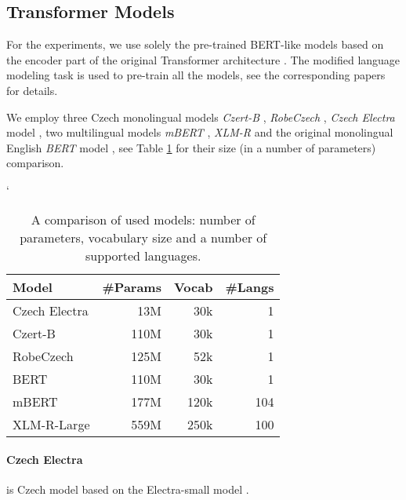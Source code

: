 \documentclass[10pt, a4paper]{article}
\begin{document}
\subsection{Transformer Models}
For the experiments, we use solely the pre-trained BERT-like models based on the encoder part of the original Transformer architecture \cite{attention-all-transformer}. The modified language modeling task is used to pre-train all the models, see the corresponding papers for details.

\par We employ three Czech monolingual models \textit{Czert-B} \cite{czert}, \textit{RobeCzech} \cite{straka2021robeczech}, \textit{Czech Electra} model \cite{czech-electra}, two multilingual models \textit{mBERT} \cite{devlin-etal-2019-bert}, \textit{XLM-R} \cite{xlm-r} and the original monolingual English \textit{BERT} model \cite{devlin-etal-2019-bert}, see Table \ref{tab:models-size} for their size (in a number of parameters) comparison.





\begin{table}[ht!]
\catcode`
\begin{adjustbox}{width=0.75\linewidth,center}
\begin{tabular}{lrrr} 
\toprule
Model        &  \multicolumn{1}{c}{\#Params} & \multicolumn{1}{c}{Vocab} & \multicolumn{1}{c}{\#Langs} \\ \midrule
Czech Electra & 13M        & 30k   & 1                             \\
Czert-B      & 110M       & 30k   & 1                             \\
RobeCzech    & 125M    & 52k   & 1                                 \\
BERT   & 110M       & 30k  & 1                             \\
mBERT        & 177M       & 120k  & 104                           \\
XLM-R-Large  & 559M       & 250k  & 100                          \\
\bottomrule
\end{tabular}
\end{adjustbox}
\caption{A comparison of used models: number of parameters, vocabulary size and a number of supported languages.}
\label{tab:models-size}
\end{table}




\paragraph{Czech Electra} \cite{czech-electra} is Czech model based on the Electra-small model \cite{clark2020electra}.
\end{document}
